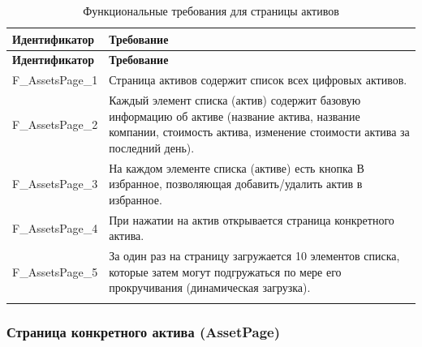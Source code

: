 \documentclass[a4paper, 14pt]{article}
\begin{document}
\begin{longtable}{| p{} | p{} |}
    \hline
    \textbf{Идентификатор}          & \textbf{Требование}                                                                                                                                                                \\
    \hline
    \endfirsthead
    \hline
    \textbf{Идентификатор}          & \textbf{Требование}                                                                                                                                                                \\
    \hline
    \endhead

    F\_AssetsPage\_1                & Страница активов содержит список всех цифровых активов.                                                                                                                            \\ \hline
    F\_AssetsPage\_2                & Каждый элемент списка (актив) содержит базовую информацию об активе (название актива, название компании, стоимость актива, изменение стоимости актива за последний день).                                                        \\ \hline
    F\_AssetsPage\_3                & На каждом элементе списка (активе) есть кнопка В избранное, позволяющая добавить/удалить актив в избранное.                                                                        \\ \hline
    F\_AssetsPage\_4                & При нажатии на актив открывается страница конкретного актива.                                                                                                                      \\ \hline
    F\_AssetsPage\_5                & За один раз на страницу загружается 10 элементов списка, которые затем могут подгружаться по мере его прокручивания (динамическая загрузка).                                       \\ \hline

    \caption{Функциональные требования для страницы активов}
\end{longtable}

\subsubsection{Страница конкретного актива (AssetPage)}
\end{document}
